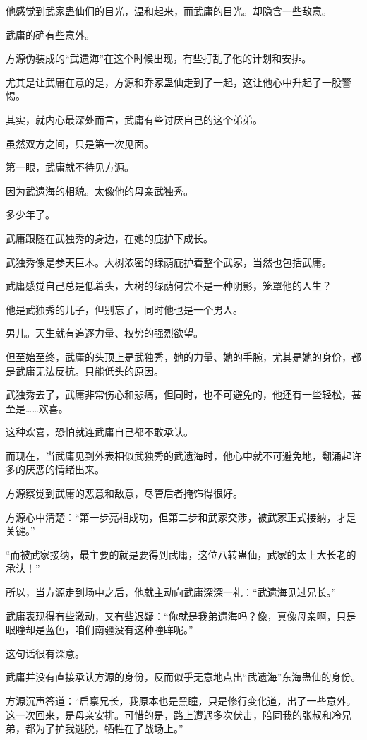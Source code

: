 \begin{this_body}
他感觉到武家蛊仙们的目光，温和起来，而武庸的目光。却隐含一些敌意。

武庸的确有些意外。

方源伪装成的“武遗海”在这个时候出现，有些打乱了他的计划和安排。

尤其是让武庸在意的是，方源和乔家蛊仙走到了一起，这让他心中升起了一股警惕。

其实，就内心最深处而言，武庸有些讨厌自己的这个弟弟。

虽然双方之间，只是第一次见面。

第一眼，武庸就不待见方源。

因为武遗海的相貌。太像他的母亲武独秀。

多少年了。

武庸跟随在武独秀的身边，在她的庇护下成长。

武独秀像是参天巨木。大树浓密的绿荫庇护着整个武家，当然也包括武庸。

武庸感觉自己总是低着头，大树的绿荫何尝不是一种阴影，笼罩他的人生？

他是武独秀的儿子，但别忘了，同时他也是一个男人。

男儿。天生就有追逐力量、权势的强烈欲望。

但至始至终，武庸的头顶上是武独秀，她的力量、她的手腕，尤其是她的身份，都是武庸无法反抗。只能低头的原因。

武独秀去了，武庸非常伤心和悲痛，但同时，也不可避免的，他还有一些轻松，甚至是……欢喜。

这种欢喜，恐怕就连武庸自己都不敢承认。

而现在，当武庸见到外表相似武独秀的武遗海时，他心中就不可避免地，翻涌起许多的厌恶的情绪出来。

方源察觉到武庸的恶意和敌意，尽管后者掩饰得很好。

方源心中清楚：“第一步亮相成功，但第二步和武家交涉，被武家正式接纳，才是关键。”

“而被武家接纳，最主要的就是要得到武庸，这位八转蛊仙，武家的太上大长老的承认！”

所以，当方源走到场中之后，他就主动向武庸深深一礼：“武遗海见过兄长。”

武庸表现得有些激动，又有些迟疑：“你就是我弟遗海吗？像，真像母亲啊，只是眼瞳却是蓝色，咱们南疆没有这种瞳眸呢。”

这句话很有深意。

武庸并没有直接承认方源的身份，反而似乎无意地点出“武遗海”东海蛊仙的身份。

方源沉声答道：“启禀兄长，我原本也是黑瞳，只是修行变化道，出了一些意外。这一次回来，是母亲安排。可惜的是，路上遭遇多次伏击，陪同我的张叔和冷兄弟，都为了护我逃脱，牺牲在了战场上。”


\end{this_body}
